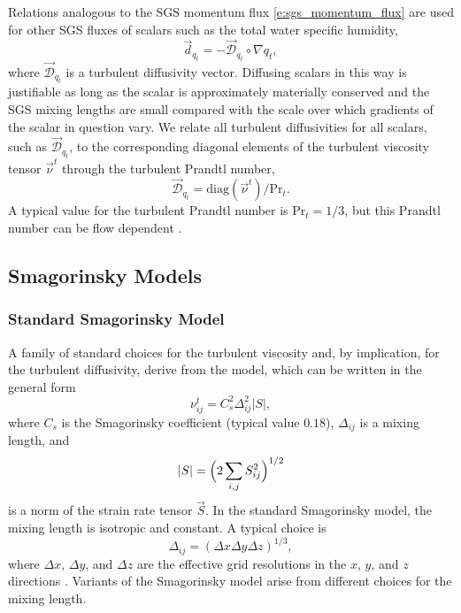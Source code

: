 \documentclass{article}
\begin{document}
Relations analogous to the SGS momentum flux  \eqref{e:sgs_momentum_flux} are used for other SGS fluxes of scalars such as the total water specific humidity,
\begin{equation}
\vec{d}_{q_t} = - \vec{\mathcal{D}}_{q_t} \circ \nabla q_t,
\end{equation}
where $\vec{\mathcal{D}}_{q_t}$ is a turbulent diffusivity vector. Diffusing scalars in this way is justifiable as long as the scalar is approximately materially conserved and the SGS mixing lengths are small compared with the scale over which gradients of the scalar in question vary. We relate all turbulent diffusivities for all scalars, such as $\vec{\mathcal{D}}_{q_t}$, to the corresponding diagonal elements of the turbulent viscosity tensor $\vec{\nu}^t$ through the turbulent Prandtl number, 
\begin{equation}
\vec{\mathcal{D}}_{q_t} = \mathrm{diag}(\vec{\nu}^t) / \mathrm{Pr}_{t}.
\end{equation} 
A typical value for the turbulent Prandtl number is $\mathrm{Pr}_{t} = 1/3$, but this Prandtl number can be flow dependent \citep[e.g.,][]{Deardorff80a}.

\subsection{Smagorinsky Models}

\subsubsection{Standard Smagorinsky Model}

A family of standard choices for the turbulent viscosity and, by implication, for the turbulent diffusivity, derive from the \citet{smagorinsky:1963} model, which can be written in the general form 
\begin{equation}
\nu^t_{ij} = C_{s}^2 \Delta^{2}_{ij} |S|,   
\label{eq:eddy-viscosity_smag}
\end{equation}
where $C_{s} $ is the Smagorinsky coefficient (typical value $0.18$), $\Delta_{ij}$ is a mixing length, and 
\begin{equation}
|S| = \Bigl(2 \sum_{i,j} S_{ij}^2 \Bigr)^{1/2}
\end{equation} 
is a norm of the strain rate tensor $\vec{S}$. In the standard Smagorinsky model, the mixing length is isotropic and constant. A typical choice is 
\begin{equation}
    \Delta_{ij} = (\Delta x \Delta y \Delta z)^{1/3},
\end{equation}
where $\Delta x$, $\Delta y$, and $\Delta z$ are the effective grid resolutions in the $x$, $y$, and $z$ directions \citep{deardorff1970}. Variants of the Smagorinsky model arise from different choices for the mixing length.
\end{document}
